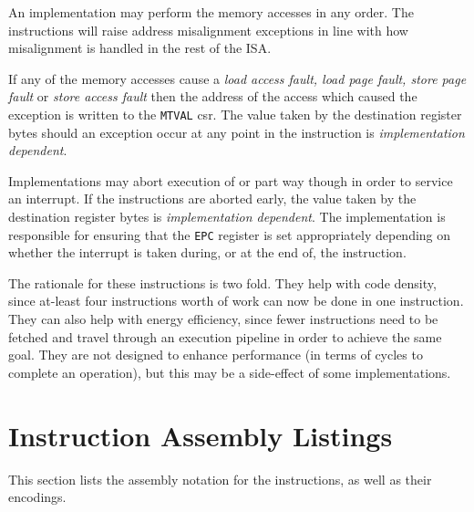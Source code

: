 \bigskip


An implementation may perform the memory accesses in any order. The instructions
will raise address misalignment exceptions in line with how misalignment is
handled in the rest of the ISA.

If any of the memory accesses cause
a {\em load access fault, load page fault, store page fault} or
{\em store access fault} then the address of the access which caused the
exception is written to the {\tt MTVAL} csr. The value taken by the
destination register bytes should an exception occur at any point in the
instruction is {\em implementation dependent}.

Implementations may abort execution of  or  part way
though in order to service an interrupt. If the instructions are aborted
early, the value taken by the destination register bytes is {\em
implementation dependent}. The implementation is responsible for ensuring
that the {\tt EPC} register is set appropriately depending on whether the
interrupt is taken during, or at the end of, the instruction.

The rationale for these instructions is two fold. They help with code density,
since at-least four instructions worth of work can now be done
in one instruction. They can also help with energy efficiency, since fewer
instructions need to be fetched and travel through an execution pipeline in
order to achieve the same goal. They are not designed to enhance performance
(in terms of cycles to complete an operation), but this may be a side-effect
of some implementations.

\newpage
\section{Instruction Assembly Listings}

This section lists the assembly notation for the instructions, as well as
their encodings.

